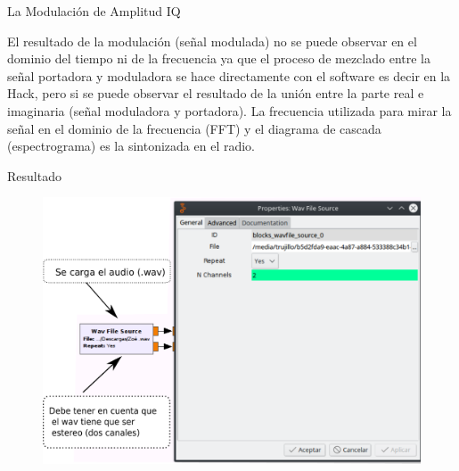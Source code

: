 \begin{frame}{La Modulación de Amplitud IQ}


El resultado de la modulación (señal modulada) no se puede observar en el dominio del tiempo ni de la frecuencia ya que el proceso de mezclado entre la señal portadora y moduladora se hace directamente con el software es decir en la Hack, pero si se puede observar el resultado de la unión entre la parte real e imaginaria (señal moduladora y portadora).  La frecuencia utilizada para mirar la señal en el dominio de la frecuencia (FFT) y el diagrama de cascada (espectrograma) es la sintonizada en el radio.

\end{frame}

\begin{frame}{Resultado}

\begin{figure}[H]
\centering
\vspace{-3mm}
\includegraphics[width=\textwidth]{parte3/lab15/pdf/lab15_4.pdf}
\end{figure}

\end{frame}
